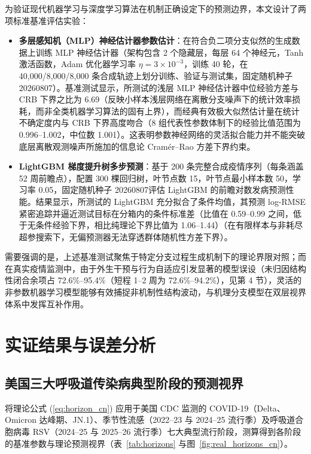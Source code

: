 \documentclass[11pt,a4paper]{article}
\theoremstyle{plain}
\theoremstyle{definition}
\begin{document}
为验证现代机器学习与深度学习算法在机制正确设定下的预测边界，本文设计了两项标准基准评估实验：
\begin{itemize}
\item \textbf{多层感知机（MLP）神经估计器参数估计}：在符合负二项分支似然的生成数据上训练 MLP 神经估计器（架构包含 2 个隐藏层，每层 64 个神经元，Tanh 激活函数，Adam 优化器学习率 $\eta=3\times 10^{-3}$，训练 40 轮，在 40,000/8,000/8,000 条合成轨迹上划分训练、验证与测试集，固定随机种子 20260807）。基准测试显示，所测试的浅层 MLP 神经估计器中位经验方差与 CRB 下界之比为 6.69（反映小样本浅层网络在离散分支噪声下的统计效率损耗，而非全类机器学习算法的固有上界），而经典有效极大似然估计量在统计不确定度内与 CRB 下界高度吻合（8 组代表性参数体制下的经验比值范围为 0.996--1.002，中位数 1.001）。这表明参数神经网络的灵活拟合能力并不能突破底层离散观测噪声所施加的信息论 Cram\'er--Rao 方差下界约束。
\item \textbf{LightGBM 梯度提升树多步预测}：基于 200 条完整合成疫情序列（每条涵盖 52 周前瞻点），配置 300 棵回归树，叶节点数 15，叶节点最小样本数 50，学习率 0.05，固定随机种子 20260807评估 LightGBM 的前瞻对数发病预测性能。结果显示，所测试的 LightGBM 充分拟合了条件均值，其预测 log-RMSE 紧密追踪并逼近测试目标在分箱内的条件标准差（比值在 0.59--0.99 之间，低于无条件经验下界，相比纯理论下界比值为 1.06--1.44）（在有限样本与非耗尽超参搜索下，无偏预测器无法穿透群体随机性方差下界）。
\end{itemize}
需要强调的是，上述基准测试聚焦于特定分支过程生成机制下的理论界限对照；而在真实疫情监测中，由于外生干预与行为自适应引发显著的模型误设（未归因结构性闭合余项占 72.6\%--95.4\%（短程 1--2 周为 72.6\%--94.2\%），见第 4 节），灵活的非参数机器学习模型能够有效捕捉非机制性结构波动，与机理分支模型在双层视界体系中发挥互补作用。

\section{实证结果与误差分析}

\subsection{美国三大呼吸道传染病典型阶段的预测视界}

将理论公式 (\ref{eq:horizon_cn}) 应用于美国 CDC 监测的 COVID-19（Delta、Omicron 达峰期、JN.1）、季节性流感（2022--23 与 2024--25 流行季）及呼吸道合胞病毒 RSV（2024--25 与 2025--26 流行季）七大典型流行阶段，测算得到各阶段的基准参数与理论预测视界（表~\ref{tab:horizons} 与图~\ref{fig:real_horizons_cn}）。
\end{document}

